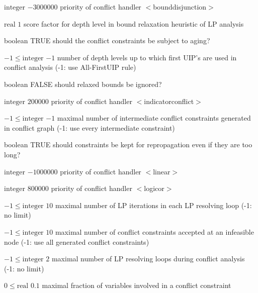 %
{$\textrm{integer}$}%
{$-3000000$}%
{priority of conflict handler $<$bounddisjunction$>$}%
{}

%
{$\textrm{real}$}%
{$1$}%
{score factor for depth level in bound relaxation heuristic of LP analysis}%
{}

%
{boolean}%
{TRUE}%
{should the conflict constraints be subject to aging?}%
{}

%
{$-1\leq\textrm{integer}$}%
{$-1$}%
{number of depth levels up to which first UIP's are used in conflict analysis (-1: use All-FirstUIP rule)}%
{}

%
{boolean}%
{FALSE}%
{should relaxed bounds be ignored?}%
{}

%
{$\textrm{integer}$}%
{$200000$}%
{priority of conflict handler $<$indicatorconflict$>$}%
{}

%
{$-1\leq\textrm{integer}$}%
{$-1$}%
{maximal number of intermediate conflict constraints generated in conflict graph (-1: use every intermediate constraint)}%
{}

%
{boolean}%
{TRUE}%
{should constraints be kept for repropagation even if they are too long?}%
{}

%
{$\textrm{integer}$}%
{$-1000000$}%
{priority of conflict handler $<$linear$>$}%
{}

%
{$\textrm{integer}$}%
{$800000$}%
{priority of conflict handler $<$logicor$>$}%
{}

%
{$-1\leq\textrm{integer}$}%
{$10$}%
{maximal number of LP iterations in each LP resolving loop (-1: no limit)}%
{}

%
{$-1\leq\textrm{integer}$}%
{$10$}%
{maximal number of conflict constraints accepted at an infeasible node (-1: use all generated conflict constraints)}%
{}

%
{$-1\leq\textrm{integer}$}%
{$2$}%
{maximal number of LP resolving loops during conflict analysis (-1: no limit)}%
{}

%
{$0\leq\textrm{real}$}%
{$0.1$}%
{maximal fraction of variables involved in a conflict constraint}%
{}

